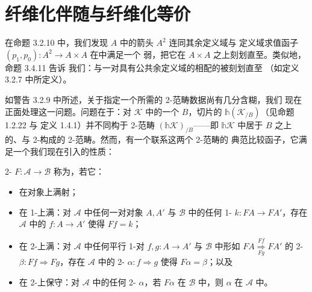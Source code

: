 \providecommand{\qcOne}{\mathbf{1}}   %
\providecommand{\qcTwo}{\mathbf{2}}   %
\providecommand{\qcor}[1]{\ulcorner#1\urcorner}   %
\providecommand{\Cat}{\mathcal{C}at}
\providecommand{\QCat}{\mathcal{Q}\mathcal{C}at}

\section{纤维化伴随与纤维化等价}\label{sec:fibered-adjunctions-and-fibered-equivalences}

在命题 3.2.10 中，我们发现 $A$ 中的箭头\trInfinityCategory{} $A^{2}$ 连同其余定义域与%
定义域求值函子 $(p_{1},p_{0})\colon A^{2}\to A\times A$ 在\trHomotopyTwoCategory{}中满足一个%
弱\trUniversalProperty，把它在 $A\times A$ 之上刻划直至\trEquivalence。类似地，命题 3.4.11 告诉%
我们：与一对具有公共余定义域的\trFunctor{}相配的\trCommaInfinityCategory{}被刻划直至%
\trFiberedEquivalence{}（如定义 3.2.7 中所定义）。

如警告 3.2.9 中所述，关于指定一个\trFiberedEquivalence{}所需的 2-范畴数据尚有几分含糊，我们%
现在正面处理这一问题。问题在于：对\trInfinityCosmos{} $\mathcal{K}$ 中的一个\trInfinityCategory{} %
$B$，切片\trInfinityCosmos{}的\trHomotopyTwoCategory{} $\mathbb{h}(\mathcal{K}_{/B})$（见命题 1.2.22 与%
定义 1.4.1）并不同构于 2-范畴 $(\mathbb{h}\mathcal{K})_{/B}$——即 $\mathbb{h}\mathcal{K}$ 中居于 %
$B$ 之上的\trIsofibration、\trFunctor{}与 2-\trCell{}构成的 2-范畴。然而，有一个联系这两个 2-范畴的%
典范比较函子，它满足一个我们现在引入的性质：

\begin{definition}[覆盖 2-函子]\label{def:smothering-two-functor}
2-\trTwoFunctor{} $F\colon\mathcal{A}\to\mathcal{B}$ 称为\trSmothering，若它：
\begin{itemize}
\item 在对象上满射；
\item 在 1-\trCell{}上满：对 $\mathcal{A}$ 中任何一对对象 $A,A'$ 与 $\mathcal{B}$ 中的任何 %
1-\trCell{} $k\colon FA\to FA'$，存在 $\mathcal{A}$ 中的 $f\colon A\to A'$ 使得 $Ff=k$；
\item 在 2-\trCell{}上满：对 $\mathcal{A}$ 中任何平行 1-\trCell{}对 $f,g\colon A\to A'$ 与 %
$\mathcal{B}$ 中形如 $FA\underset{\scriptstyle Fg}{\overset{\scriptstyle Ff}{\Rightarrow}}FA'$ %
的 2-\trCell{} $\beta\colon Ff\Rightarrow Fg$，存在 $\mathcal{A}$ 中的 2-\trCell{} %
$\alpha\colon f\Rightarrow g$ 使得 $F\alpha=\beta$；以及
\item 在 2-\trCell{}上保守：对 $\mathcal{A}$ 中的任何 2-\trCell{} $\alpha$，若 $F\alpha$ 在 %
$\mathcal{B}$ 中\trInvertible，则 $\alpha$ 在 $\mathcal{A}$ 中\trInvertible。
\end{itemize}
\end{definition}

